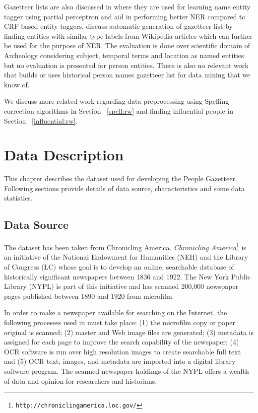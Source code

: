 \documentclass[letterpaper,11pt]{report}
\begin{document}
Gazetteer lists are also discussed in \cite{carlson2009learning} where they are used for learning name entity tagger using partial perceptron and aid in performing better NER compared to CRF based entity taggers.
\cite{zhang2009novel} discuss automatic generation of gazetteer list by finding entities with similar type labels from Wikipedia articles which can further be used for the purpose of NER. The evaluation is done over scientific domain of Archeology considering subject, temporal terms and location as named entities but no evaluation is presented for person entities.
There is also no relevant work that builds or uses historical person names gazetteer list for data mining that we know of.



We discuss more related work regarding data preprocessing using Spelling correction algorithms in Section ~\ref{spell:rw} and finding influential people in Section ~\ref{influential:rw}.






\chapter{Data Description}
\label{chapter:data description}

This chapter describes the dataset used for developing the People Gazetteer. Following sections provide details of data source, characteristics and some data statistics.

\section{Data Source} 

The dataset has been taken from Chronicling America.
\noindent \emph{Chronicling
America}\footnote{\texttt{http://chroniclingamerica.loc.gov/}} is an
initiative of the National Endowment for Humanities (NEH) and the
Library of Congress (LC) whose goal is to develop an online,
searchable database of historically significant newspapers between
1836 and 1922. The New York Public Library (NYPL) is part of this
initiative and has scanned 200,000 newspaper pages published between
1890 and 1920 from microfilm.

In order to make a newspaper available for searching on the Internet,
the following processes used in \cite{dutta2011learning} must take place: (1) the microfilm copy or
paper original is scanned; (2) master and Web image files are
generated; (3) metadata is assigned for each page to improve the
search capability of the newspaper; (4) OCR software is run over high
resolution images to create searchable full text and (5) OCR text,
images, and metadata are imported into a digital library software
program. The scanned newspaper holdings of the NYPL offers a wealth of
data and opinion for researchers and historians.
\end{document}
